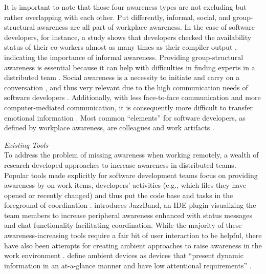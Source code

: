 \noindent It is important to note that those four awareness types are not excluding but rather overlapping with each other. Put differently, informal, social, and group-structural awareness are all part of workplace awareness. In the case of software developers, for instance, a study shows that developers checked the availability status of their co-workers almost as many times as their compiler output \autocite{ko2007information}, indicating the importance of informal awareness. Providing group-structural awareness is essential because it can help with difficulties in finding experts in a distributed team \autocite{herbsleb2003empirical}. Social awareness is a necessity to initiate and carry on a conversation \autocite{gutwin1996workspace}, and thus very relevant due to the high communication needs of software developers \autocite{perry1994people}. Additionally, with less face-to-face communication and more computer-mediated communication, it is consequently more difficult to transfer emotional information \autocite{rivera1996effects}. Most common \enquote{elements} for software developers, as defined by workplace awareness, are colleagues and work artifacts \autocite{ko2007information}.

\medskip\noindent\textit{Existing Tools}\\
To address the problem of missing awareness when working remotely, a wealth of research developed approaches to increase awareness in distributed teams. Popular tools made explicitly for software development teams focus on providing awareness by on work items, developers’ activities (e.g., which files they have opened or recently changed) and thus put the code base and tasks in the foreground of coordination \autocite{biehl2007fastdash, jakobsen2009wipdash, eick1992seesoft, deline2005easing}. \textcite{cheng2003jazzing} introduces JazzBand, an IDE plugin visualizing the team members to increase peripheral awareness enhanced with status messages and chat functionality facilitating coordination. While the majority of these awareness-increasing tools require a fair bit of user interaction to be helpful, there have also been attempts for creating ambient approaches to raise awareness in the work environment \autocite{morrison2020facilitating, otjacques2006ambient, downs2012ambient, alavi2012ambient, rocker2004using}. \citeauthor{downs2012ambient} define ambient devices as devices that \enquote{present dynamic information in an at-a-glance manner and have low attentional requirements} \autocite[p.~508]{downs2012ambient}.

